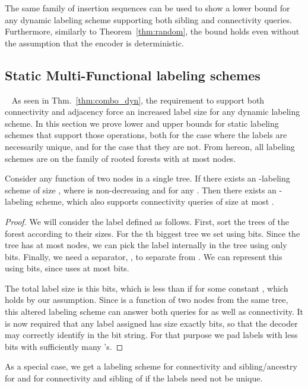 \documentclass{llncs}
\begin{document}
The same family of insertion sequences can be used to show a 
lower bound for any dynamic labeling scheme supporting both sibling and
connectivity queries. Furthermore, similarly to Theorem~\ref{thm:random}, the
bound holds even without the assumption that the encoder is deterministic.


\subsection{Static Multi-Functional   labeling schemes}~\label{sec:static-multi}
As seen in Thm.~\ref{thm:combo_dyn}, the requirement to support both connectivity and adjacency force an increased label size for any dynamic labeling scheme.
In this section we prove  lower and upper bounds for static labeling schemes that support those operations, both for the case where the labels are necessarily unique, and for the case that they are not. From hereon, all labeling schemes are on the family of rooted forests with at most  nodes.

\begin{theorem}\label{thm:static-con-alter-ub}
    Consider any function  of two nodes in a single tree. If there exists an
    -labeling scheme of size , where  is non-decreasing and
     for any .
    Then there exists an -labeling scheme, which also supports connectivity
    queries of size at most .
\end{theorem}
\begin{proof}
    We will consider the label  defined as
    follows. First, sort the trees of the forest according to their sizes. For the th biggest tree we set  using  bits. Since the tree has at most  nodes, we can pick the label  internally in the tree using only  bits. Finally, we need a separator, , to separate  from . We can represent this using  bits, since  uses at most  bits.

    The total label size is this  bits, which is less than
     if  for some
    constant , which holds by our assumption. Since  is a function of two nodes from
    the same tree, this altered labeling scheme can answer both queries for 
    as well as connectivity. It is now required that any label assigned has size exactly  bits, so that the decoder may correctly identify  in the bit string. For that purpose we  pad labels with less bits with sufficiently many 's.
\end{proof}

As a special case, we get a labeling scheme for connectivity and
sibling/ancestry for  and for connectivity and sibling of
 if the labels need not be unique.
\end{document}
